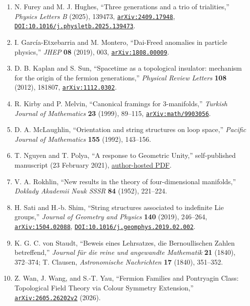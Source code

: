 \documentclass[11pt]{article}
\theoremstyle{remark}
\begin{document}
\begin{enumerate}[leftmargin=2em]
\item N. Furey and M. J. Hughes, ``Three generations and a trio of trialities,'' \emph{Physics Letters B} (2025), 139473, \href{https://arxiv.org/abs/2409.17948}{\nolinkurl{arXiv:2409.17948}}, \href{https://doi.org/10.1016/j.physletb.2025.139473}{\nolinkurl{DOI:10.1016/j.physletb.2025.139473}}.
\item I. García-Etxebarria and M. Montero, ``Dai-Freed anomalies in particle physics,'' \emph{JHEP} \textbf{08} (2019), 003, \href{https://arxiv.org/abs/1808.00009}{\nolinkurl{arXiv:1808.00009}}.
\item D. B. Kaplan and S. Sun, ``Spacetime as a topological insulator: mechanism for the origin of the fermion generations,'' \emph{Physical Review Letters} \textbf{108} (2012), 181807, \href{https://arxiv.org/abs/1112.0302}{\nolinkurl{arXiv:1112.0302}}.
\item R. Kirby and P. Melvin, ``Canonical framings for 3-manifolds,'' \emph{Turkish Journal of Mathematics} \textbf{23} (1999), 89--115, \href{https://arxiv.org/abs/math/9903056}{\nolinkurl{arXiv:math/9903056}}.
\item D. A. McLaughlin, ``Orientation and string structures on loop space,'' \emph{Pacific Journal of Mathematics} \textbf{155} (1992), 143--156.
\item T. Nguyen and T. Polya, ``A response to Geometric Unity,'' self-published manuscript (23 February 2021), \href{https://files.timothynguyen.org/geometric_unity.pdf}{author-hosted PDF}.
\item V. A. Rokhlin, ``New results in the theory of four-dimensional manifolds,'' \emph{Doklady Akademii Nauk SSSR} \textbf{84} (1952), 221--224.
\item H. Sati and H.-b. Shim, ``String structures associated to indefinite Lie groups,'' \emph{Journal of Geometry and Physics} \textbf{140} (2019), 246--264, \href{https://arxiv.org/abs/1504.02088}{\nolinkurl{arXiv:1504.02088}}, \href{https://doi.org/10.1016/j.geomphys.2019.02.002}{\nolinkurl{DOI:10.1016/j.geomphys.2019.02.002}}.
\item K. G. C. von Staudt, ``Beweis eines Lehrsatzes, die Bernoullischen Zahlen betreffend,'' \emph{Journal für die reine und angewandte Mathematik} \textbf{21} (1840), 372--374; T. Clausen, \emph{Astronomische Nachrichten} \textbf{17} (1840), 351--352.
\item Z. Wan, J. Wang, and S.-T. Yau, ``Fermion Families and Pontryagin Class: Topological Field Theory via Colour Symmetry Extension,'' \href{https://arxiv.org/abs/2605.26202}{\nolinkurl{arXiv:2605.26202v2}} (2026).

\end{enumerate}
\end{document}
